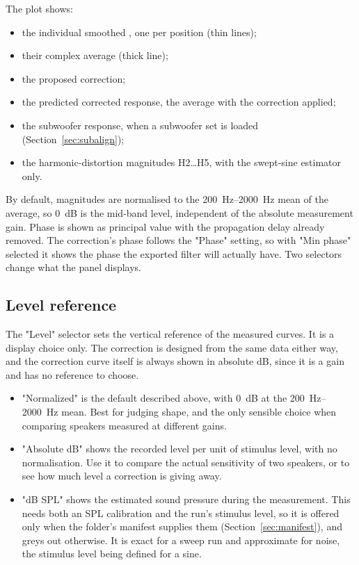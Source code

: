 The plot shows:
\begin{itemize}[nosep]
  \item the individual smoothed , one per position (thin lines);
  \item their complex average (thick line);
  \item the proposed correction;
  \item the predicted corrected response, the average with the correction applied;
  \item the subwoofer response, when a subwoofer set is loaded (Section~\ref{sec:subalign});
  \item the harmonic-distortion magnitudes H2\ldots{}H5, with the swept-sine estimator only.
\end{itemize}

\noindent By default, magnitudes are normalised to the \SIrange{200}{2000}{\hertz} mean of the average, so \SI{0}{\dB} is the mid-band level, independent of the absolute measurement gain. Phase is shown as principal value with the propagation delay already removed. The correction's phase follows the "Phase" setting, so with "Min phase" selected it shows the phase the exported filter will actually have. Two selectors change what the panel displays.

\subsection{Level reference}\label{sec:levelref}
The "Level" selector sets the vertical reference of the measured curves. It is a display choice only. The correction is designed from the same data either way, and the correction curve itself is always shown in absolute \si{\dB}, since it is a gain and has no reference to choose.

\begin{itemize}[nosep]
  \item "Normalized" is the default described above, with \SI{0}{\dB} at the \SIrange{200}{2000}{\hertz} mean. Best for judging shape, and the only sensible choice when comparing speakers measured at different gains.
  \item "Absolute dB" shows the recorded level per unit of stimulus level, with no normalisation. Use it to compare the actual sensitivity of two speakers, or to see how much level a correction is giving away.
  \item "dB SPL" shows the estimated sound pressure during the measurement. This needs both an SPL calibration and the run's stimulus level, so it is offered only when the folder's manifest supplies them (Section~\ref{sec:manifest}), and greys out otherwise. It is exact for a sweep run and approximate for noise, the stimulus level being defined for a sine.
\end{itemize}

